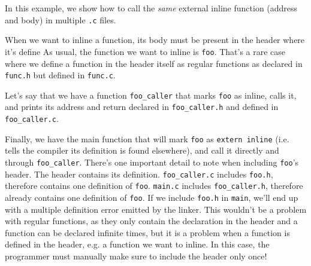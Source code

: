 \begin{exmp}\;

\textup{
In this example, we show how to call the \textit{same} external inline function (address and body) in multiple \texttt{.c} files.
}

\textup{
When we want to inline a function, its body must be present in the header where it's define As usual, the function we want to inline is \texttt{foo}. That's a rare case where we define a function in the header itself as regular functions as declared in \texttt{func.h} but defined in \texttt{func.c}.
}



Let's say that we have a function \texttt{foo\_caller} that marks \texttt{foo} as inline, calls it, and prints its address and return declared in \texttt{foo\_caller.h} and defined in \texttt{foo\_caller.c}.








Finally, we have the main function that will mark \texttt{foo} as \texttt{extern inline} (i.e. tells the compiler its definition is found elsewhere), and call it directly and through \texttt{foo\_caller}. There's one important detail to note when including \texttt{foo}'s header. The header contains its definition. \texttt{foo\_caller.c} includes \texttt{foo.h}, therefore contains one definition of \texttt{foo}. \texttt{main.c} includes \texttt{foo\_caller.h}, therefore already contains one definition of \texttt{foo}. If we include \texttt{foo.h} in \texttt{main}, we'll end up with a multiple definition error emitted by the linker. This wouldn't be a problem with regular functions, as they only contain the declaration in the header and a function can be declared infinite times, but it is a problem when a function is defined in the header, e.g. a function we want to inline. In this case, the programmer must manually make sure to include the header only once!


\end{exmp}
